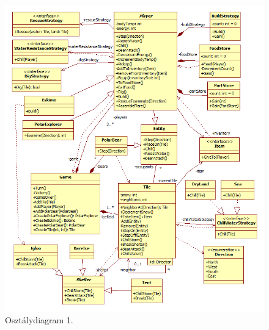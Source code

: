\begin{figure}[H]
	\begin{center}
		\includegraphics[width=18cm]{chapters/chapter07/ClassDiagramPart1.png}
		\caption{Osztálydiagram 1.}
		\label{fig:OsztalyDiagramPart1}
	\end{center}
\end{figure}
